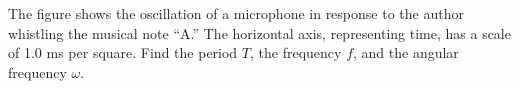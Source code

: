         The figure shows the oscillation of a microphone in response to the
        author whistling the musical note ``A.'' The horizontal axis, representing
        time, has a scale of 1.0 ms per square. Find the period $T$, the frequency $f$, and
         the angular frequency $\omega$.\answercheck
